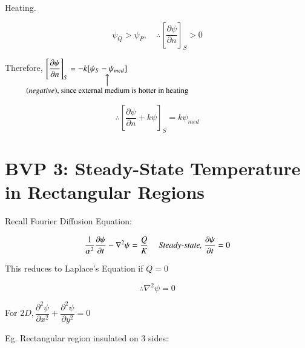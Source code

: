 \documentclass{report}
\makeatletter
\newcommand\parrow[3][3ex]{%
 \begin{array}[t]{@{}c@{}} #2 \\
  \left\uparrow\vcenter{\hrule height #1}\right.\kern-\nulldelimiterspace\\
  \makebox[0pt]{\small#3}
  \end{array}%
}
\makeatother
\begin{document}
Heating.

$$
\psi_{Q}>\psi_{P}, \quad \therefore\left[\dfrac{\partial \psi}{\partial n}\right]_{S}>0
$$

Therefore, $\left[\dfrac{\partial \psi}{\partial n}\right]_{S}=-k[\parrow{\psi_{S}-\psi_{med}}{$(negative)$, since external medium is hotter in heating}]$

$$
\therefore\left[\dfrac{\partial \psi}{\partial n}+k \psi\right]_{S}=k \psi_{med}
$$

\section{BVP 3: Steady-State Temperature in Rectangular Regions}

Recall Fourier Diffusion Equation:

$$
\dfrac{1}{\alpha^{2}} \dfrac{\partial \psi}{\partial t}-\nabla^{2} \psi=\dfrac{Q}{K} \quad \text { \textit{Steady-state,} } \dfrac{\partial \psi}{\partial t}=0
$$

This reduces to Laplace's Equation if $Q=0$

$$
\therefore \nabla^{2} \psi=0
$$

For $2 D, \dfrac{\partial^{2} \psi}{\partial x^{2}}+\dfrac{\partial^{2} \psi}{\partial y^{2}}=0$

Eg. Rectangular region insulated on 3 sides:
\end{document}
